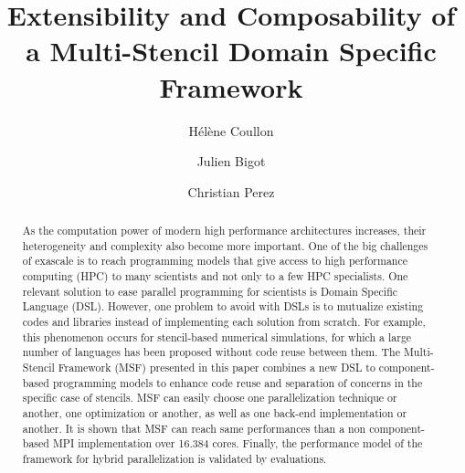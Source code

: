\documentclass[smallextended]{svjour3}       %
\begin{document}

\title{Extensibility and Composability of a Multi-Stencil Domain Specific Framework}
\author{H\'el\`ene Coullon \and Julien Bigot \and Christian Perez}
\maketitle
\begin{abstract}
As the computation power of modern high performance architectures increases, their heterogeneity and complexity also become more important. One of the big challenges of exascale is to reach programming models that give access to high performance computing (HPC) to many scientists and not only to a few HPC specialists. One relevant solution to ease parallel programming for scientists is Domain Specific Language (DSL). However, one problem to avoid with DSLs is to mutualize existing codes and libraries instead of implementing each solution from scratch. For example, this phenomenon occurs for stencil-based numerical simulations, for which a large number of languages has been proposed without code reuse between them. 
The Multi-Stencil Framework (MSF) presented in this paper combines a new DSL to component-based programming models to enhance code reuse and separation of concerns in the specific case of stencils. MSF can easily choose one parallelization technique or another, one optimization or another, as well as one back-end implementation or another. It is shown that MSF can reach same performances than a non component-based MPI implementation over 16.384 cores. Finally, the performance model of the framework for hybrid parallelization is validated by evaluations.

\end{abstract}
\end{document}

